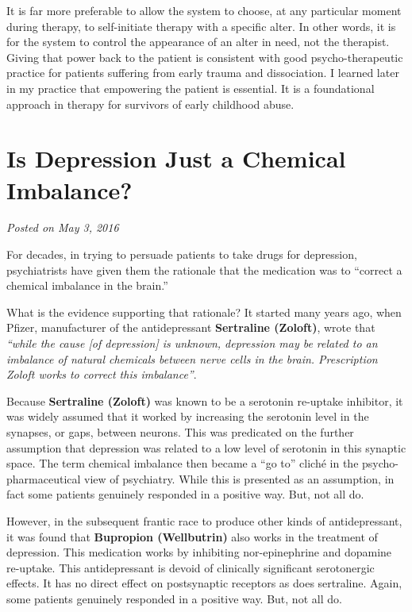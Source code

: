 \documentclass[]{book}
\begin{document}
It is far more preferable to allow the system to choose, at any particular moment during therapy, to self-initiate therapy with a specific alter. In other words, it is for the system to control the appearance of an alter in need, not the therapist. Giving that power back to the patient is consistent with good psycho-therapeutic practice for patients suffering from early trauma and dissociation. I learned later in my practice that empowering the patient is essential. It is a foundational approach in therapy for survivors of early childhood abuse.

\hypertarget{is-depression-just-a-chemical-imbalance}{%
\section{Is Depression Just a Chemical Imbalance?}\label{is-depression-just-a-chemical-imbalance}}

\emph{Posted on May 3, 2016}

For decades, in trying to persuade patients to take drugs for depression, psychiatrists have given them the rationale that the medication was to ``correct a chemical imbalance in the brain.''

What is the evidence supporting that rationale? It started many years ago, when Pfizer, manufacturer of the antidepressant \textbf{Sertraline (Zoloft)}, wrote that \emph{``while the cause {[}of depression{]} is unknown, depression may be related to an imbalance of natural chemicals between nerve cells in the brain. Prescription Zoloft works to correct this imbalance''}.

Because \textbf{Sertraline (Zoloft)} was known to be a serotonin re-uptake inhibitor, it was widely assumed that it worked by increasing the serotonin level in the synapses, or gaps, between neurons. This was predicated on the further assumption that depression was related to a low level of serotonin in this synaptic space. The term chemical imbalance then became a ``go to'' cliché in the psycho-pharmaceutical view of psychiatry. While this is presented as an assumption, in fact some patients genuinely responded in a positive way. But, not all do.

However, in the subsequent frantic race to produce other kinds of antidepressant, it was found that \textbf{Bupropion (Wellbutrin)} also works in the treatment of depression. This medication works by inhibiting nor-epinephrine and dopamine re-uptake. This antidepressant is devoid of clinically significant serotonergic effects. It has no direct effect on postsynaptic receptors as does sertraline. Again, some patients genuinely responded in a positive way. But, not all do.
\end{document}
